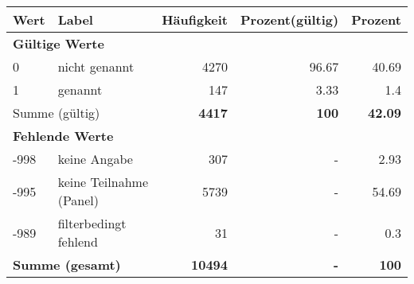      \begin{longtable}{lXrrr}
     \toprule
     \textbf{Wert} & \textbf{Label} & \textbf{Häufigkeit} & \textbf{Prozent(gültig)} & \textbf{Prozent} \\
     \endhead
     \midrule
     \multicolumn{5}{l}{\textbf{Gültige Werte}}\\

     0 &
     \multicolumn{1}{X}{ nicht genannt   } &


       \num{4270} &
       \num[round-mode=places,round-precision=2]{96.67} &
         \num[round-mode=places,round-precision=2]{40.69} \\

     1 &
     \multicolumn{1}{X}{ genannt   } &


       \num{147} &
       \num[round-mode=places,round-precision=2]{3.33} &
         \num[round-mode=places,round-precision=2]{1.4} \\
     \midrule
     \multicolumn{2}{l}{Summe (gültig)} &
       \textbf{\num{4417}} &
     \textbf{\num{100}} &
       \textbf{\num[round-mode=places,round-precision=2]{42.09}} \\
     \multicolumn{5}{l}{\textbf{Fehlende Werte}}\\
       -998 &
       keine Angabe &
         \num{307} &
        - &
         \num[round-mode=places,round-precision=2]{2.93} \\
       -995 &
       keine Teilnahme (Panel) &
         \num{5739} &
        - &
         \num[round-mode=places,round-precision=2]{54.69} \\
       -989 &
       filterbedingt fehlend &
         \num{31} &
        - &
         \num[round-mode=places,round-precision=2]{0.3} \\
     \midrule
     \multicolumn{2}{l}{\textbf{Summe (gesamt)}} &
          \textbf{\num{10494}} &
        \textbf{-} &
        \textbf{\num{100}} \\
     \bottomrule
     \end{longtable}
     
